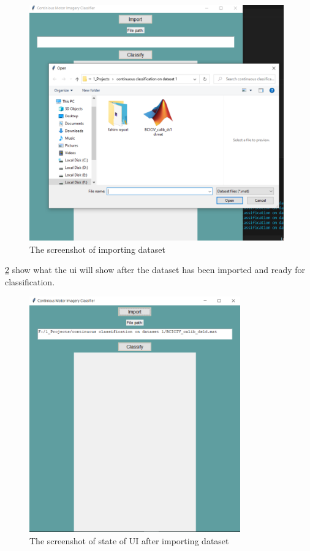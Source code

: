 \documentclass[12pt,a4paper]{report}
\begin{document}
\begin{figure}[h]
	\centering 
	
	\includegraphics[height =4in]{1 (3).PNG}
	\caption{ The screenshot of importing dataset}
	\label{Fig import}
\end{figure}
\justify \ref{Fig after import} show what the ui will show after the dataset has been imported and ready for classification.
\begin{figure}[h]
	\centering 
	
	\includegraphics[height =4in]{1 (2).PNG}
	\caption{ The screenshot of state of UI after importing dataset}
	\label{Fig after import}
\end{figure}
\end{document}
